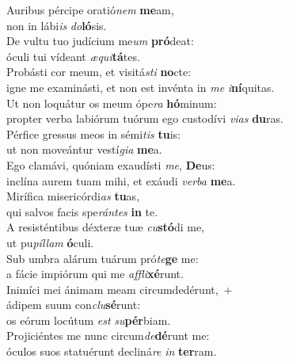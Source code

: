 \evenverse Auribus pércipe oratió\textit{nem} \textbf{me}am,~\*\\
\evenverse non in lábi\textit{is} \textit{do}\textbf{ló}sis.\\
\oddverse De vultu tuo judícium me\textit{um} \textbf{pró}deat:~\*\\
\oddverse óculi tui vídeant \textit{æ}\textit{qui}\textbf{tá}tes.\\
\evenverse Probásti cor meum, et visitá\textit{sti} \textbf{no}cte:~\*\\
\evenverse igne me examinásti, et non est invénta in \textit{me} \textit{i}\textbf{ní}quitas.\\
\oddverse Ut non loquátur os meum ópe\textit{ra} \textbf{hó}minum:~\*\\
\oddverse propter verba labiórum tuórum ego custodívi \textit{vi}\textit{as} \textbf{du}ras.\\
\evenverse Pérfice gressus meos in sémi\textit{tis} \textbf{tu}is:~\*\\
\evenverse ut non moveántur vestí\textit{gi}\textit{a} \textbf{me}a.\\
\oddverse Ego clamávi, quóniam exaudísti \textit{me}, \textbf{De}us:~\*\\
\oddverse inclína aurem tuam mihi, et exáudi \textit{ver}\textit{ba} \textbf{me}a.\\
\evenverse Mirífica misericórdi\textit{as} \textbf{tu}as,~\*\\
\evenverse qui salvos facis spe\textit{rán}\textit{tes} \textbf{in} te.\\
\oddverse A resisténtibus déxteræ tuæ \textit{cu}\textbf{stó}di me,~\*\\
\oddverse ut pu\textit{píl}\textit{lam} \textbf{ó}culi.\\
\evenverse Sub umbra alárum tuárum pró\textit{te}\textbf{ge} me:~\*\\
\evenverse a fácie impiórum qui me \textit{af}\textit{fli}\textbf{xé}runt.\\
\oddverse Inimíci mei ánimam meam circumdedérunt,~+\\
\oddverse  ádipem suum con\textit{clu}\textbf{sé}runt:~\*\\
\oddverse os eórum locútum \textit{est} \textit{su}\textbf{pér}biam.\\
\evenverse Projiciéntes me nunc circum\textit{de}\textbf{dé}runt me:~\*\\
\evenverse óculos suos statuérunt decliná\textit{re} \textit{in} \textbf{ter}ram.\\
